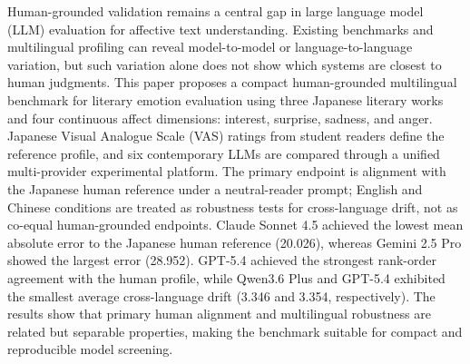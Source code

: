 Human-grounded validation remains a central gap in large language model (LLM) evaluation for affective text understanding. Existing benchmarks and multilingual profiling can reveal model-to-model or language-to-language variation, but such variation alone does not show which systems are closest to human judgments. This paper proposes a compact human-grounded multilingual benchmark for literary emotion evaluation using three Japanese literary works and four continuous affect dimensions: interest, surprise, sadness, and anger. Japanese Visual Analogue Scale (VAS) ratings from student readers define the reference profile, and six contemporary LLMs are compared through a unified multi-provider experimental platform. The primary endpoint is alignment with the Japanese human reference under a neutral-reader prompt; English and Chinese conditions are treated as robustness tests for cross-language drift, not as co-equal human-grounded endpoints. Claude Sonnet 4.5 achieved the lowest mean absolute error to the Japanese human reference (20.026), whereas Gemini 2.5 Pro showed the largest error (28.952). GPT-5.4 achieved the strongest rank-order agreement with the human profile, while Qwen3.6 Plus and GPT-5.4 exhibited the smallest average cross-language drift (3.346 and 3.354, respectively). The results show that primary human alignment and multilingual robustness are related but separable properties, making the benchmark suitable for compact and reproducible model screening.

